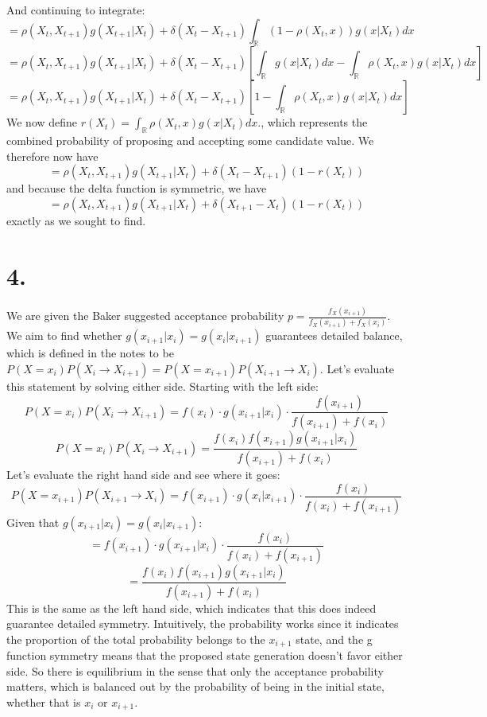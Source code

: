 \documentclass{article}
\begin{document}
{\[\]
And continuing to integrate:
\[
  = \rho (X_t, X_{t+1}) g(X_{t+1} | X_t) + \delta(X_t - X_{t+1}) \int_{\mathbb{R}} (1 - \rho(X_t, x)) g(x | X_t) dx
\]
\[
  = \rho (X_t, X_{t+1}) g(X_{t+1} | X_t) + \delta(X_t - X_{t+1}) [\int_{\mathbb{R}} g(x | X_t) dx - \int_{\mathbb{R}} \rho(X_t, x) g(x | X_t) dx]
\]
\[
  = \rho (X_t, X_{t+1}) g(X_{t+1} | X_t) + \delta(X_t - X_{t+1}) [1 - \int_{\mathbb{R}} \rho(X_t, x) g(x | X_t) dx]
\]
We now define \(r(X_t) = \int_{\mathbb{R}} \rho(X_t,x)g(x|X_t) dx. \), which represents the combined probability of proposing and accepting some candidate value. We therefore now have 
\[
  = \rho (X_t, X_{t+1}) g(X_{t+1} | X_t) + \delta(X_t - X_{t+1}) (1 - r(X_t))
\]
and because the delta function is symmetric, we have 
\[
  = \rho (X_t, X_{t+1}) g(X_{t+1} | X_t) + \delta(X_{t+1} - X_t) (1 - r(X_t))
\]
exactly as we sought to find.

}
{\Large 

\section*{4.}

We are given the Baker suggested acceptance probability \( p = \frac{f_X(x_{i+1})}{f_X(x_{i+1}) + f_X(x_i)}. \) We aim to find whether \(g(x_{i+1} | x_i) = g(x_i | x_{i+1})\) guarantees detailed balance, which is defined in the notes to be \( P(X = x_i) P(X_i \rightarrow X_{i+1}) = P(X = x_{i+1}) P(X_{i+1} \rightarrow X_i) \). Let's evaluate this statement by solving either side. Starting with the left side:
\[ 
  P(X = x_i) P(X_i \rightarrow X_{i+1})  = f(x_i) \cdot g(x_{i+1} | x_i) \cdot \frac{f(x_{i+1})}{f(x_{i+1}) + f(x_i)}
\]
\[ 
  P(X = x_i) P(X_i \rightarrow X_{i+1})  = \frac{f(x_i) f(x_{i+1}) g(x_{i+1} | x_i)}{f(x_{i+1}) + f(x_i)}
\]
Let's evaluate the right hand side and see where it goes:
\[
  P(X = x_{i+1}) P(X_{i+1} \rightarrow X_i) = f(x_{i+1}) \cdot g(x_i | x_{i+1}) \cdot \frac{f(x_i)}{f(x_i) + f(x_{i+1})}
\]
Given that \(g(x_{i+1} | x_i) = g(x_i | x_{i+1})\):
\[
  = f(x_{i+1}) \cdot g(x_{i+1} | x_i) \cdot \frac{f(x_i)}{f(x_i) + f(x_{i+1})}
\]
\[
  = \frac{f(x_i) f(x_{i+1}) g(x_{i+1} | x_i)}{f(x_{i+1}) + f(x_i)}
\]
This is the same as the left hand side, which indicates that this does indeed guarantee detailed symmetry. Intuitively, the probability works since it indicates the proportion of the total probability belongs to the \(x_{i+1}\) state, and the g function symmetry means that the proposed state generation doesn't favor either side. So there is equilibrium in the sense that only the acceptance probability matters, which is balanced out by the probability of being in the initial state, whether that is \(x_i\) or \(x_{i+1}\).

}
\end{document}
